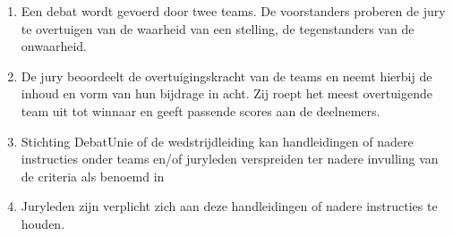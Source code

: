 
\begin{enumerate}
\item Een debat wordt gevoerd door twee teams. De voorstanders proberen de jury te overtuigen van de waarheid van een stelling, de tegenstanders van de onwaarheid.
\item De jury beoordeelt de overtuigingskracht van de teams en neemt hierbij de inhoud en vorm van hun bijdrage in acht. Zij roept het meest overtuigende team uit tot winnaar en geeft passende scores aan de deelnemers.
\item Stichting DebatUnie of de wedstrijdleiding kan handleidingen of nadere instructies onder teams en/of juryleden verspreiden ter nadere invulling van de criteria als benoemd in \item Juryleden zijn verplicht zich aan deze handleidingen of nadere instructies te houden.
\end{enumerate}
